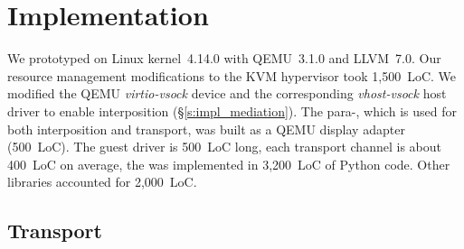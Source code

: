 
\section{Implementation}
\label{s:impl}

We prototyped \AvA on Linux kernel~4.14.0 with QEMU~3.1.0 and LLVM~7.0.
Our resource management modifications to the KVM hypervisor took 1,500~LoC.
We modified the QEMU \emph{virtio-vsock} device and the corresponding \emph{vhost-vsock} host driver to enable interposition (\S\ref{s:impl_mediation}).
The para-\vdev, which is used for both interposition and transport, was built as a QEMU display adapter (500~LoC). The guest driver is 500~LoC long, each transport channel is about 400~LoC on average, the \CAvA was implemented in 3,200~LoC of Python code. Other libraries accounted for 2,000~LoC.

\subsection{Transport}

